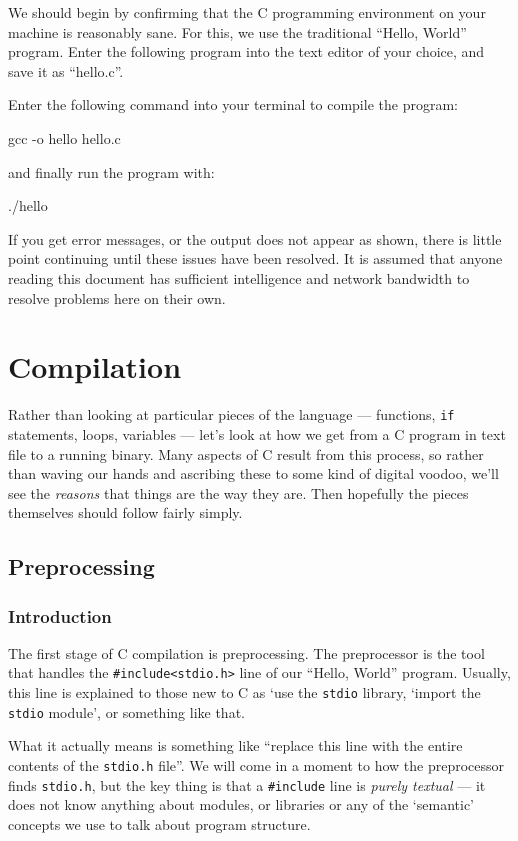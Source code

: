 \documentclass[a4paper,10pt]{report}
\newcommand{\drmcode}[3]{\begin{minipage}{\columnwidth}\end{minipage}}
\newcommand{\ccode}[2]{\drmcode{C}{#1}{#2.c}}
\newcommand{\kw}[1]{\texttt{#1}}
\begin{document}
We should begin by confirming that the C programming environment on
your machine is reasonably sane. For this, we use the traditional
``Hello, World'' program. Enter the following program into the text
editor of your choice, and save it as ``hello.c''.

\ccode{\texttt{hello.c}}{hello}

\noindent
Enter the following command into your terminal to compile
the program:

gcc -o hello hello.c
\END

\noindent
and finally run the program with:

./hello
\END

\noindent{}
If you get error messages, or the output does not appear as shown,
there is little point continuing until these issues have been
resolved. It is assumed that anyone reading this document has
sufficient intelligence and network bandwidth to resolve problems here
on their own.

\chapter{Compilation}

Rather than looking at particular pieces of the language ---
functions, \kw{if} statements, loops, variables --- let's look at how
we get from a C program in text file to a running binary. Many aspects
of C result from this process, so rather than waving our hands and
ascribing these to some kind of digital voodoo, we'll see the
\emph{reasons} that things are the way they are. Then hopefully the
pieces themselves should follow fairly simply.

\section{Preprocessing}

\subsection{Introduction}

The first stage of C compilation is preprocessing. The preprocessor is
the tool that handles the \verb!#include<stdio.h>! line of our
``Hello, World'' program. Usually, this line is explained to those new
to C as `use the \kw{stdio} library, `import the \kw{stdio} module',
or something like that.

What it actually means is something like ``replace this line with the
entire contents of the \kw{stdio.h} file''. We will come in a moment
to how the preprocessor finds \kw{stdio.h}, but the key thing is that
a \verb!#include! line is \emph{purely textual} --- it does not know
anything about modules, or libraries or any of the `semantic' concepts
we use to talk about program structure.
\end{document}
